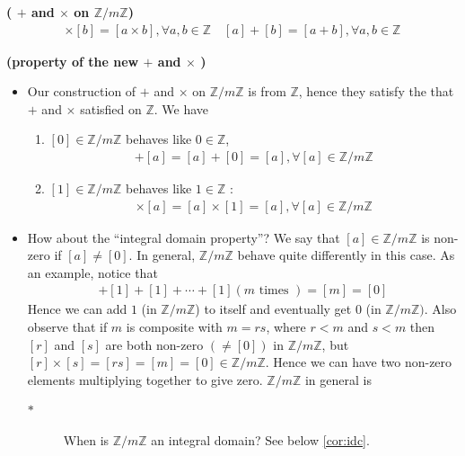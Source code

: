 \documentclass{article}
\newcommand{\bfs}[1]{\textbf{({#1}) }}
\begin{document}
\begin{defa}{\bfs{ $+$ and $\times$ on $\mathbb{Z} / m \mathbb{Z}$}}
\begin{align*}
[a] \times[b]=[a \times b], \forall a, b \in \mathbb{Z} \quad[a]+[b]=[a+b], \forall a, b \in \mathbb{Z}
\end{align*}
\end{defa}

\begin{rema}{\bfs{property of the new $+$ and $\times$ }}
\begin{itemize}
    \item Our construction of $+$ and $\times$ on $\mathbb{Z} / m \mathbb{Z}$ is from $\mathbb{Z}$, hence they satisfy the  that $+$ and $\times$ satisfied on $\mathbb{Z} .$ We have
\begin{enumerate}
    \item $[0] \in \mathbb{Z} / m \mathbb{Z}$ behaves like $0 \in \mathbb{Z}$,
    \begin{align*}
[0]+[a]=[a]+[0]=[a], \forall[a] \in \mathbb{Z} / m \mathbb{Z}
\end{align*}
    \item  $[1] \in \mathbb{Z} / m \mathbb{Z}$ behaves like $1 \in \mathbb{Z}$ :
\begin{align*}
[1] \times[a]=[a] \times[1]=[a], \forall[a] \in \mathbb{Z} / m \mathbb{Z}
\end{align*}

\end{enumerate}
\item How about the ``integral domain property''? We say that $[a] \in \mathbb{Z} / m \mathbb{Z}$ is non-zero if $[a] \neq[0] .$ In general,  $\mathbb{Z} / m \mathbb{Z}$ behave quite differently in this case. As an example, notice that
\begin{align*}
[1]+[1]+[1]+\cdots+[1](m \text { times })=[m]=[0]
\end{align*}
Hence we can add $1$ (in $\mathbb{Z} / m \mathbb{Z}$) to itself and eventually get 0 (in $\mathbb{Z} / m \mathbb{Z})$. Also observe that if $m$ is composite with $m=r s$, where $r<m$ and $s<m$ then $[r]$ and
$[s]$ are both non-zero $(\neq[0])$ in $\mathbb{Z} / m \mathbb{Z}$, but $[r] \times[s]=[r s]=[m]=[0] \in \mathbb{Z} / m \mathbb{Z} .$ Hence we
can have two non-zero elements multiplying together to give zero. $\mathbb{Z} / m \mathbb{Z}$ in general is  
\begin{description}
\item[$\ast$]When is $\mathbb{Z} / m \mathbb{Z}$ an  integral domain? See below \cref{cor:idc}.
\end{description}

\end{itemize}
\end{rema}
\end{document}
